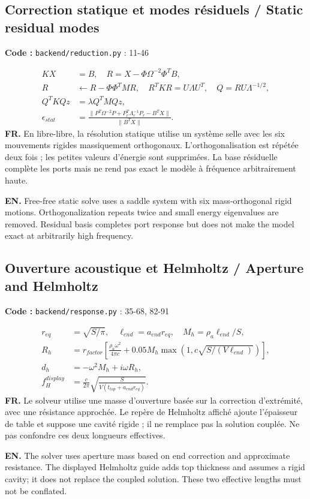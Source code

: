\documentclass[10pt,a4paper]{article}
\newcommand{\FR}[1]{\textbf{FR.} #1\par}\newcommand{\EN}[1]{{\selectlanguage{english}\textbf{EN.} #1\par}}
\newcommand{\loc}[1]{{\small\color{ink}\textbf{Code :} #1\par}}
\begin{document}
\begin{samepage}\subsection{Correction statique et modes résiduels / Static residual modes}
\loc{\texttt{backend/reduction.py} : 11-46}
\begin{align}K X&=B,\quad R=X-\Phi\Omega^{-2}\Phi^TB,\\
R&\leftarrow R-\Phi\Phi^TMR,\quad R^TKR=U\Lambda U^T,\quad Q=RU\Lambda^{-1/2},\\
Q^TKQz&=\lambda Q^TMQz,\\
\epsilon_{stat}&=\frac{\|P^T\Omega^{-2}P+P_r^T\Lambda_r^{-1}P_r-B^TX\|}{\|B^TX\|}.\end{align}
\FR{En libre-libre, la résolution statique utilise un système selle avec les six mouvements rigides massiquement orthogonaux. L’orthogonalisation est répétée deux fois ; les petites valeurs d’énergie sont supprimées. La base résiduelle complète les ports mais ne rend pas exact le modèle à fréquence arbitrairement haute.}
\EN{Free-free static solve uses a saddle system with six mass-orthogonal rigid motions. Orthogonalization repeats twice and small energy eigenvalues are removed. Residual basis completes port response but does not make the model exact at arbitrarily high frequency.}
\end{samepage}
\begin{samepage}\subsection{Ouverture acoustique et Helmholtz / Aperture and Helmholtz}
\loc{\texttt{backend/response.py} : 35-68, 82-91}
\begin{align}r_{eq}&=\sqrt{S/\pi},\quad\ell_{end}=a_{end}r_{eq},\quad M_h=\rho_a\ell_{end}/S,\\
R_h&=r_{factor}\left[\frac{\rho_a\omega^2}{4\pi c}+0.05M_h\max\left(1,c\sqrt{S/(V\ell_{end})}\right)\right],\\
d_h&=-\omega^2M_h+i\omega R_h,\\
f_H^{display}&=\frac{c}{2\pi}\sqrt{\frac S{V(t_{top}+a_{end}r_{eq})}}.\end{align}
\FR{Le solveur utilise une masse d’ouverture basée sur la correction d’extrémité, avec une résistance approchée. Le repère de Helmholtz affiché ajoute l’épaisseur de table et suppose une cavité rigide ; il ne remplace pas la solution couplée. Ne pas confondre ces deux longueurs effectives.}
\EN{The solver uses aperture mass based on end correction and approximate resistance. The displayed Helmholtz guide adds top thickness and assumes a rigid cavity; it does not replace the coupled solution. These two effective lengths must not be conflated.}
\end{samepage}
\end{document}
